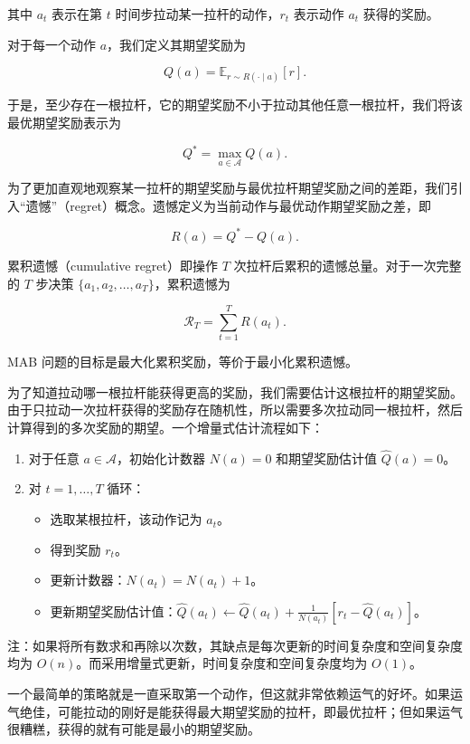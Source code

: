 其中 \(a_t\) 表示在第 \(t\) 时间步拉动某一拉杆的动作，\(r_t\) 表示动作 \(a_t\) 获得的奖励。

对于每一个动作 \(a\)，我们定义其期望奖励为

\[
Q(a)=\mathbb{E}_{r\sim R(\cdot\mid a)}[r].
\]

于是，至少存在一根拉杆，它的期望奖励不小于拉动其他任意一根拉杆，我们将该最优期望奖励表示为

\[
Q^{*}=\max_{a\in\mathcal{A}} Q(a).
\]

为了更加直观地观察某一拉杆的期望奖励与最优拉杆期望奖励之间的差距，我们引入``遗憾''（regret）概念。遗憾定义为当前动作与最优动作期望奖励之差，即

\[
R(a)=Q^{*}-Q(a).
\]

累积遗憾（cumulative regret）即操作 \(T\) 次拉杆后累积的遗憾总量。对于一次完整的 \(T\) 步决策 \(\{a_1,a_2,\ldots,a_T\}\)，累积遗憾为

\[
\mathcal{R}_T=\sum_{t=1}^{T} R(a_t).
\]

MAB 问题的目标是最大化累积奖励，等价于最小化累积遗憾。

为了知道拉动哪一根拉杆能获得更高的奖励，我们需要估计这根拉杆的期望奖励。由于只拉动一次拉杆获得的奖励存在随机性，所以需要多次拉动同一根拉杆，然后计算得到的多次奖励的期望。一个增量式估计流程如下：

\begin{enumerate}
\def\labelenumi{\arabic{enumi}.}
\tightlist
\item
  对于任意 \(a\in\mathcal{A}\)，初始化计数器 \(N(a)=0\) 和期望奖励估计值 \(\hat{Q}(a)=0\)。
\item
  对 \(t=1,\ldots,T\) 循环：

  \begin{itemize}
  \tightlist
  \item
    选取某根拉杆，该动作记为 \(a_t\)。
  \item
    得到奖励 \(r_t\)。
  \item
    更新计数器：\(N(a_t)=N(a_t)+1\)。
  \item
    更新期望奖励估计值：\(\hat{Q}(a_t)\leftarrow \hat{Q}(a_t)+\frac{1}{N(a_t)}[r_t-\hat{Q}(a_t)]\)。
  \end{itemize}
\end{enumerate}

注：如果将所有数求和再除以次数，其缺点是每次更新的时间复杂度和空间复杂度均为 \(O(n)\)。而采用增量式更新，时间复杂度和空间复杂度均为 \(O(1)\)。

一个最简单的策略就是一直采取第一个动作，但这就非常依赖运气的好坏。如果运气绝佳，可能拉动的刚好是能获得最大期望奖励的拉杆，即最优拉杆；但如果运气很糟糕，获得的就有可能是最小的期望奖励。

